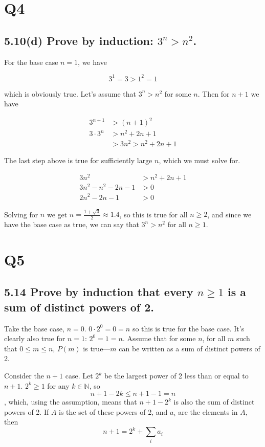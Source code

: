 \documentclass{article}
\begin{document}
\section*{Q4} %
\subsection*{5.10(d) \normalsize Prove by induction: $3^n > n^2$.}

For the base case $n=1$, we have

$$3^1 = 3 > 1^2 = 1$$

which is obviously true. Let's assume that $3^n > n^2$ for some $n$. Then for $n + 1$ we have

\begin{align*}
  3^{n+1} &> (n+ 1)^2 \\
  3\cdot 3^n &> n^2 + 2n + 1 \\
  &> 3n^2 > n^2 + 2n + 1
\end{align*}

The last step above is true for sufficiently large $n$, which we must solve for.

\begin{align*}
  3n^2 &> n^2 + 2n + 1\\
  3n^2 - n^2 -2n -1 &> 0 \\
  2n^2 - 2n - 1 &> 0
\end{align*}

Solving for $n$ we get $n = \frac{1+\sqrt{3}}{2} \approx 1.4$, so this is true for all $n \geq 2$, and since we have the base case as true, we can say that $3^n > n^2$ for all $n \geq 1$.

\section*{Q5}
\subsection*{5.14 \normalsize Prove by induction that every $n \geq 1$ is a sum of distinct powers of 2.}

Take the base case, $n = 0$. $0\cdot 2^0 = 0 = n$ so this is true for the base case. It's clearly also true for $n = 1$: $2^0 = 1 = n$. Assume that for some $n$, for all $m$ such that $0 \leq m \leq n$, $P(m)$ is true---$m$ can be written as a sum of distinct powers of 2. 

Consider the $n+1$ case. Let $2^k$ be the largest power of 2 less than or equal to $n+1$. $2^k \geq 1$ for any $k \in \mathbb{N}$, so $$n + 1 - 2k \leq n + 1 - 1 = n$$, which, using the assumption, means that $n + 1 - 2^k$ is also the sum of distinct powers of 2. If $A$ is the set of these powers of 2, and $a_i$ are the elements in $A$, then $$n + 1 = 2^k + \sum_{i} a_i$$
\end{document}
